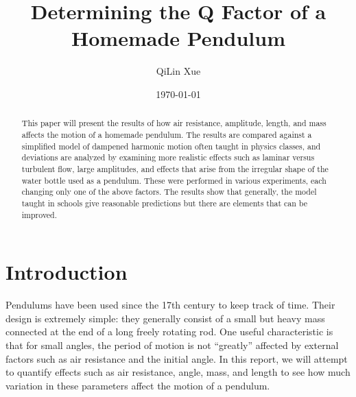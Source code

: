 \documentclass[%
 reprint,
 amsmath,amssymb
 aps,
]{revtex4-2}
\begin{document}

\title{Determining the Q Factor of a Homemade Pendulum}%

\author{QiLin Xue}

\date{\today}%

\begin{abstract}
This paper will present the results of how air resistance, amplitude, length, and mass affects the motion of a homemade pendulum. The results are compared against a simplified model of dampened harmonic motion often taught in physics classes, and deviations are analyzed by examining more realistic effects such as laminar versus turbulent flow, large amplitudes, and effects that arise from the irregular shape of the water bottle used as a pendulum. These were performed in various experiments, each changing only one of the above factors. The results show that generally, the model taught in schools give reasonable predictions but there are elements that can be improved.
\end{abstract}

\maketitle

\section{Introduction}

Pendulums have been used since the 17th century to keep track of time.\cite{pendulum} Their design is extremely simple: they generally consist of a small but heavy mass connected at the end of a long freely rotating rod. One useful characteristic is that for small angles, the period of motion is not ``greatly'' affected by external factors such as air resistance and the initial angle. In this report, we will attempt to quantify effects such as air resistance, angle, mass, and length to see how much variation in these parameters affect the motion of a pendulum.
\end{document}
